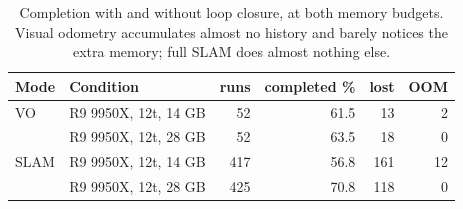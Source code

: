 \begin{table}[H]
\centering
\caption{Completion with and without loop closure, at both memory budgets. Visual odometry accumulates almost no history and barely notices the extra memory; full SLAM does almost nothing else.}
\label{tab:gen-modes}
\small
\begin{tabular}{@{}llrrrr@{}}
\toprule
Mode & Condition & runs & completed \% & lost & OOM \\
\midrule
VO & R9 9950X, 12t, 14 GB & 52 & 61.5 & 13 & 2 \\
 & R9 9950X, 12t, 28 GB & 52 & 63.5 & 18 & 0 \\
\midrule
SLAM & R9 9950X, 12t, 14 GB & 417 & 56.8 & 161 & 12 \\
 & R9 9950X, 12t, 28 GB & 425 & 70.8 & 118 & 0 \\
\bottomrule
\end{tabular}
\end{table}
